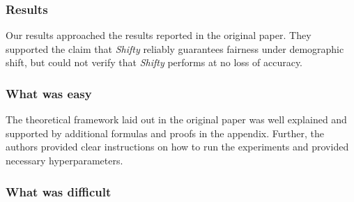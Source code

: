 \subsubsection*{Results}


Our results approached the results reported in the original paper. They supported the claim that \textit{Shifty} reliably guarantees fairness under demographic shift, but could not verify that \textit{Shifty} performs at no loss of accuracy. 

\subsubsection*{What was easy}


The theoretical framework laid out in the original paper was well explained and supported by additional formulas and proofs in the appendix. Further, the authors provided clear instructions on how to run the experiments and provided necessary hyperparameters.

\subsubsection*{What was difficult}


